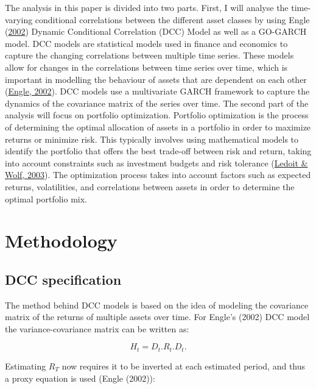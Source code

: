 \documentclass[11pt,preprint, authoryear]{elsarticle}
\numberwithin{equation}{section}
\numberwithin{figure}{section}
\numberwithin{table}{section}
\begin{document}
The analysis in this paper is divided into two parts. First, I will
analyse the time-varying conditional correlations between the different
asset classes by using Engle
(\protect\hyperlink{ref-engle2002dynamic}{2002}) Dynamic Conditional
Correlation (DCC) Model as well as a GO-GARCH model. DCC models are
statistical models used in finance and economics to capture the changing
correlations between multiple time series. These models allow for
changes in the correlations between time series over time, which is
important in modelling the behaviour of assets that are dependent on
each other (\protect\hyperlink{ref-engle2002dynamic}{Engle, 2002}). DCC
models use a multivariate GARCH framework to capture the dynamics of the
covariance matrix of the series over time. The second part of the
analysis will focus on portfolio optimization. Portfolio optimization is
the process of determining the optimal allocation of assets in a
portfolio in order to maximize returns or minimize risk. This typically
involves using mathematical models to identify the portfolio that offers
the best trade-off between risk and return, taking into account
constraints such as investment budgets and risk tolerance
(\protect\hyperlink{ref-ledoit2003improved}{Ledoit \& Wolf, 2003}). The
optimization process takes into account factors such as expected
returns, volatilities, and correlations between assets in order to
determine the optimal portfolio mix.

\hypertarget{methodology}{%
\section{Methodology}\label{methodology}}

\hypertarget{dcc-specification}{%
\subsection{DCC specification}\label{dcc-specification}}

The method behind DCC models is based on the idea of modeling the
covariance matrix of the returns of multiple assets over time. For
Engle's (2002) DCC model the variance-covariance matrix can be written
as:

\begin{equation} \label{dcc}
H_t = D_t.R_t.D_t.
\end{equation}

Estimating \(R_T\) now requires it to be inverted at each estimated
period, and thus a proxy equation is used (Engle (2002)):
\end{document}
